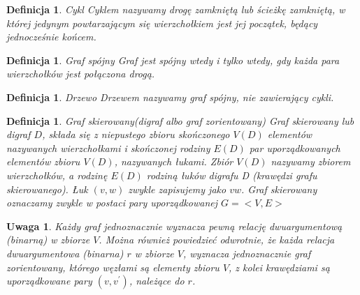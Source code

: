 \documentclass[12pt,a4paper]{report}
\newtheorem{definition}[theorem]{Definicja}
\newtheorem{uwaga}{Uwaga}
\begin{document}
\begin{definition}{Cykl \cite[Rozdział 3]{wilson2008}}
Cyklem nazywamy drogę zamkniętą lub ścieżkę zamkniętą, w której jedynym powtarzającym się wierzchołkiem jest jej początek, będący jednocześnie końcem.
\end{definition}


\begin{definition}{Graf spójny \cite[Rozdział 3]{wilson2008}}
Graf jest spójny wtedy i tylko wtedy, gdy każda para wierzchołków jest połączona drogą.
\end{definition}


\begin{definition}{Drzewo \cite[Rozdział 4]{wilson2008}}
Drzewem nazywamy graf spójny, nie zawierający cykli.
\end{definition}

\begin{definition}{Graf skierowany(digraf albo graf zorientowany) \cite[Rozdział 7]{wilson2008}}
Graf skierowany lub digraf $D$, składa się z niepustego zbioru skończonego $V(D)$ elementów nazywanych wierzchołkami i skończonej rodziny $E(D)$ par uporządkowanych elementów zbioru $V(D)$, nazywanych łukami. Zbiór $V(D)$ nazywamy zbiorem wierzchołków, a rodzinę $E(D)$ rodziną łuków digrafu D (krawędzi grafu skierowanego). Łuk $(v,w)$ zwykle zapisujemy jako $vw$. Graf skierowany oznaczamy zwykle w postaci pary uporządkowanej $G=<V,E>$\\
\end{definition}

\begin{uwaga}
Każdy graf jednoznacznie wyznacza pewną relację dwuargumentową (binarną) w zbiorze $V$. Można również powiedzieć odwrotnie, że każda relacja dwuargumentowa (binarna) $r$ w zbiorze $V$, wyznacza jednoznacznie graf zorientowany, którego węzłami są elementy zbioru $V$, z kolei krawędziami są uporządkowane pary $(v,v^{'})$, należące do $r$. 
\end{uwaga}
\end{document}
